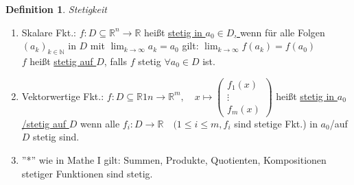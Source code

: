 \documentclass[a4paper,11pt]{article}
\newtheorem{definition}{Definition}[section]
\begin{document}
\begin{definition}
	Stetigkeit
\end{definition}
\begin{enumerate}[label=\alph*)]
	\item Skalare Fkt.: $f\colon D\subseteq\mathbb{R}^n\rightarrow\mathbb{R}$ heißt \underline{stetig in $a_0\in D$, } wenn für alle Folgen $(a_k)_{k\in\mathbb{N}}$ in $D$ mit $\lim_{k\rightarrow\infty}a_k=a_0$ gilt: $\lim_{k\rightarrow\infty}f(a_k)=f(a_0)$ \\
	$f$ heißt \underline{stetig auf $D$}, falls $f$ stetig $\forall a_0\in D$ ist.
	\item Vektorwertige Fkt.: $f\colon D\subseteq\mathbb{R}1n\rightarrow\mathbb{R}^m,\quad x\mapsto\begin{pmatrix}f_1(x)\\\vdots\\f_m(x)\end{pmatrix}$ heißt \underline{stetig in $a_0$/stetig auf $D$} wenn alle $f_i\colon D\rightarrow\mathbb{R}\quad(1\leq i\leq m, f_i$ sind stetige Fkt.) in $a_0$/auf $D$ stetig sind.
	\item ''*'' wie in Mathe I gilt: Summen, Produkte, Quotienten, Kompositionen stetiger Funktionen sind stetig. \\
\end{enumerate}

\newpage
 
\end{document}
